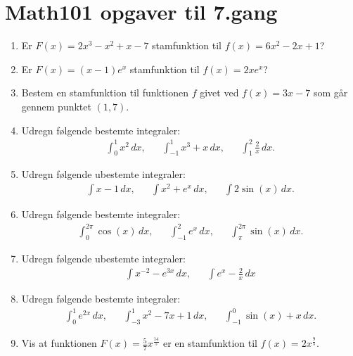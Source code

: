 \newpage
\section{Math101 opgaver til 7.gang}

\begin{enumerate}
	\item Er $F(x)=2x^3-x^2+x-7$ stamfunktion til $f(x)=6x^2-2x+1$?
	
	
	\item Er $F(x)=(x-1)e^x$ stamfunktion til $f(x)=2xe^x$?
	
	\item Bestem en stamfunktion til funktionen $f$ givet ved $f(x)=3x-7$ som går gennem punktet $ (1,7) $.
	
	\item Udregn følgende bestemte integraler:
	\begin{align*}
	\int_0^1 x^2 \, dx,&& \int_{-1}^1 x^3+x \, dx, && \int_1^2 \frac{2}{x}\, dx. 
	\end{align*}
		
	
	\item Udregn følgende ubestemte integraler:
	\begin{align*}
	\int x-1 \, dx, && \int x^2+e^x \, dx,&& \int 2\sin(x)\, dx.
	\end{align*}
	
	\item Udregn følgende bestemte integraler:
	\begin{align*}
	\int_{0}^{2\pi} \cos(x) \, dx,&& \int_{-1}^2 e^x \, dx, && \int_{\pi}^{2\pi} \sin(x) \, dx.
	\end{align*}
	
	\item Udregn følgende ubestemte integraler:
	\begin{align*}
	\int x^{-2}-e^{3x} \,dx ,&& \int e^{x}-\frac{2}{x}\, dx
	\end{align*}
	
	
	\item Udregn følgende bestemte integraler:
	\begin{align*}
	\int_0^1 e^{2x}\, dx,&& \int_{-3}^1 x^2 -7x+1 \, dx,&& \int_{-1}^0 \sin(x)+x\, dx.
	\end{align*}
	
	
	
	
	
	

	
	\item Vis at funktionen $F(x)=\frac{5}{7}x^{\frac{14}{5}}$ er en stamfunktion til $f(x)=2x^{\frac{9}{5}}$.
	

\end{enumerate}
